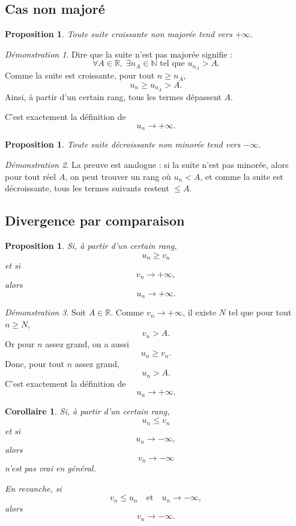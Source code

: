 \documentclass[11pt,a4paper]{article}
\theoremstyle{definition}
\theoremstyle{plain}
\newtheorem{proposition}[definition]{Proposition}
\newtheorem{corollaire}[definition]{Corollaire}
\theoremstyle{remark}
\newtheorem*{demonstrationlibre}{Démonstration}
\newcommand{\R}{\mathbb{R}}
\newcommand{\N}{\mathbb{N}}
\begin{document}
\subsection{Cas non majoré}

\begin{proposition}
Toute suite croissante non majorée tend vers $+\infty$.
\end{proposition}

\begin{demonstrationlibre}
Dire que la suite n'est pas majorée signifie :
\[
\forall A\in\R,\;\exists n_A\in\N\text{ tel que }u_{n_A}>A.
\]
Comme la suite est croissante, pour tout $n\geq n_A$,
\[
u_n\geq u_{n_A}>A.
\]
Ainsi, à partir d'un certain rang, tous les termes dépassent $A$.

C'est exactement la définition de
\[
u_n\to+\infty.
\]
\end{demonstrationlibre}

\begin{proposition}
Toute suite décroissante non minorée tend vers $-\infty$.
\end{proposition}

\begin{demonstrationlibre}
La preuve est analogue : si la suite n'est pas minorée, alors pour tout réel $A$, on peut trouver un rang où $u_n<A$, et comme la suite est décroissante, tous les termes suivants restent $\leq A$.
\end{demonstrationlibre}

\subsection{Divergence par comparaison}

\begin{proposition}
Si, à partir d'un certain rang,
\[
u_n\geq v_n
\]
et si
\[
v_n\to+\infty,
\]
alors
\[
u_n\to+\infty.
\]
\end{proposition}

\begin{demonstrationlibre}
Soit $A\in\R$. Comme $v_n\to+\infty$, il existe $N$ tel que pour tout $n\geq N$,
\[
v_n>A.
\]
Or pour $n$ assez grand, on a aussi
\[
u_n\geq v_n.
\]
Donc, pour tout $n$ assez grand,
\[
u_n>A.
\]
C'est exactement la définition de
\[
u_n\to+\infty.
\]
\end{demonstrationlibre}

\begin{corollaire}
Si, à partir d'un certain rang,
\[
u_n\leq v_n
\]
et si
\[
u_n\to-\infty,
\]
alors
\[
v_n\to-\infty
\]
n'est pas vrai en général.

En revanche, si
\[
v_n\leq u_n
\quad \text{et}\quad
u_n\to-\infty,
\]
alors
\[
v_n\to-\infty.
\]
\end{corollaire}
\end{document}
